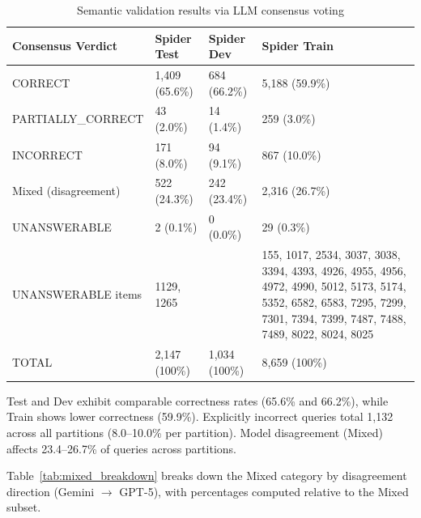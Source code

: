 \documentclass[print]{einformatica}
\begin{document}
\begin{table}[ht]
    \caption{Semantic validation results via LLM consensus voting}
    \label{tab:semantic}
    \centering
    \footnotesize
    \begin{tabular}{lp{}p{}p{}}
        \toprule
        \textbf{Consensus Verdict} & \textbf{Spider Test} & \textbf{Spider Dev} & \textbf{Spider Train} \\
        \midrule
        CORRECT & 1,409 (65.6\%) & 684 (66.2\%) & 5,188 (59.9\%) \\
        PARTIALLY\_CORRECT & 43 (2.0\%) & 14 (1.4\%) & 259 (3.0\%) \\
        INCORRECT & 171 (8.0\%) & 94 (9.1\%) & 867 (10.0\%) \\
        Mixed (disagreement) & 522 (24.3\%) & 242 (23.4\%) & 2,316 (26.7\%) \\
        UNANSWERABLE & 2 (0.1\%) & 0 (0.0\%) & 29 (0.3\%) \\
        UNANSWERABLE items & 1129, 1265 &  & 155, 1017, 2534, 3037, 3038, 3394, 4393, 4926, 4955, 4956, 4972, 4990, 5012, 5173, 5174, 5352, 6582, 6583, 7295, 7299, 7301, 7394, 7399, 7487, 7488, 7489, 8022, 8024, 8025 \\
        TOTAL & 2,147 (100\%) & 1,034 (100\%) & 8,659 (100\%) \\
        \bottomrule
    \end{tabular}
\end{table}

Test and Dev exhibit comparable correctness rates (65.6\% and 66.2\%), while Train shows lower correctness (59.9\%). Explicitly incorrect queries total 1,132 across all partitions (8.0--10.0\% per partition). Model disagreement (Mixed) affects 23.4--26.7\% of queries across partitions.

Table~\ref{tab:mixed_breakdown} breaks down the Mixed category by disagreement direction (Gemini $\rightarrow$ GPT-5), with percentages computed relative to the Mixed subset.
\end{document}
